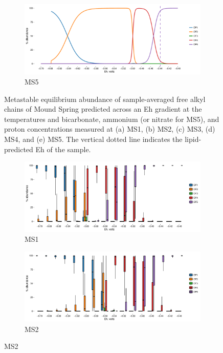 \begin{figure}[h]\ContinuedFloat

    \begin{subfigure}[b]{\linewidth}
    	\includegraphics[width=\linewidth]{"figs_app2/Mound OF5_thermo"}
    	\caption{MS5}
        \label{fig:MS5_thermo}
    \end{subfigure}
    
    \caption[Metastable equilibrium abundance of sample-averaged free alkyl chains of Mound Spring]{Metastable equilibrium abundance of sample-averaged free alkyl chains of Mound Spring predicted across an Eh gradient at the temperatures and bicarbonate, ammonium (or nitrate for MS5), and proton concentrations measured at (a) MS1, (b) MS2, (c) MS3, (d) MS4, and (e) MS5. The vertical dotted line indicates the lipid-predicted Eh of the sample.}
    \label{fig:MS_thermo}
\end{figure}

\begin{figure}[h]
\centering

    \begin{subfigure}[b]{\linewidth}
       	\includegraphics[width=1\linewidth]{"figs_app2/boxplot_ggplot_02bin Mound OF1 iter 999"}
       	\caption{MS1}
        \label{fig:MS1_mc}
    \end{subfigure}
    \begin{subfigure}[b]{\linewidth}
    	\includegraphics[width=1\linewidth]{"figs_app2/boxplot_ggplot_02bin Mound OF2 iter 999"}
    	\caption{MS2}
        \label{fig:MS2_mc}
    \end{subfigure}
    
\end{figure}

